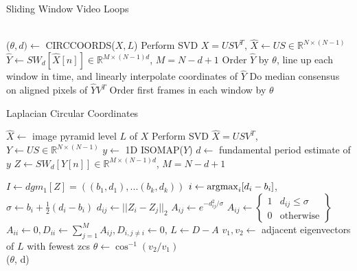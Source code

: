 \documentclass{article}
\newcommand{\argmax}{\operatornamewithlimits{argmax}}
\begin{document}
\begin{algorithm}[t]
  \caption{Sliding Window Video Loops}\label{alg:videoreordering}
  \begin{algorithmic}[1]
     \\
    \State ($\theta, d) \gets$ CIRCCOORDS($X, L$)
    \State Perform SVD $X = USV^T$, $\hat{X} \gets US \in \mathbb{R}^{N \times (N-1)}$
    \State $\hat{Y} \gets SW_d[\hat{X}[n]] \in \mathbb{R}^{M \times (N-1)d}$, $M = N-d+1$
        \State Order $\hat{Y}$ by $\theta$, line up each window in time, and linearly interpolate coordinates of $\hat{Y}$
        \State Do median consensus on aligned pixels of $\hat{Y}V^T$ \label{algline:medianconsensus}
    \Else
        \State Order first frames in each window by $\theta$
    \EndIf
    \EndProcedure
  \end{algorithmic}
\end{algorithm}


\begin{algorithm}[t]
    \caption{Laplacian Circular Coordinates}
    \begin{algorithmic}[1]
    \State $\hat{X} \gets $ image pyramid level $L$ of $X$
    \State Perform SVD $\hat{X} = USV^T$, $Y \gets US \in \mathbb{R}^{N \times (N-1)}$
    \State $y \gets$ 1D ISOMAP($Y$) \cite{tenenbaum2000global}
    \State $d \gets$ fundamental period estimate of $y$ \cite{Mcleod05asmarter}
    \State $Z \gets SW_{d}[Y[n]] \in \mathbb{R}^{M \times (N-1)d}$, $M = N-d+1$

    \State $I \gets dgm_1[Z] = ((b_1, d_1), ... (b_k, d_k))$
    \State $i \gets \argmax_{i}[d_i - b_i]$, $\sigma \gets b_i + \frac{1}{2}(d_i - b_i)$
    \State $d_{ij} \gets ||Z_i - Z_j||_2$
        \State $A_{ij} \gets e^{-d_{ij}^2/\sigma}$
    \Else
        \State $A_{ij} \gets \left\{ \begin{array}{cc} 1 & d_{ij} \leq \sigma \\ 0 & \text{otherwise} \end{array} \right\}$
    \EndIf
    \State $A_{ii} \gets 0, D_{ii} \gets \sum_{j=1}^M A_{ij}, D_{i, j \neq i} \gets 0$, $L \gets D - A$
    \State $v_1, v_2 \gets $ adjacent eigenvectors of $L$ with fewest zcs
    \State $\theta \gets \cos^{-1}(v_2/v_1)$\\
    \Return ($\theta$, d)
    \EndProcedure
  \end{algorithmic}
\end{algorithm}
\end{document}
